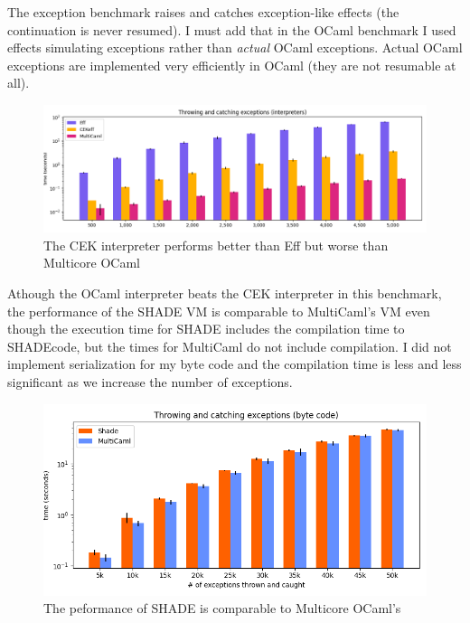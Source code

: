 \documentclass[class=article, crop=false]{standalone}
\begin{document}
The exception benchmark raises and catches exception-like effects (the
continuation is never resumed). I must add that in the OCaml benchmark I used
effects simulating exceptions rather than \emph{actual} OCaml exceptions. Actual
OCaml exceptions are implemented very efficiently in OCaml (they are not
resumable at all).

\begin{figure}
    \centering
    \includegraphics[width=40em]{eval_plots/interp_exception.png}
    \caption{The CEK interpreter performs better than Eff but worse than
    Multicore OCaml}
    \label{fig:exception-interpreters}
\end{figure}

Athough the OCaml interpreter beats the CEK interpreter in this benchmark, the
performance of the SHADE VM is comparable to MultiCaml's VM even though the
execution time for SHADE includes the compilation time to SHADEcode,
but the times for MultiCaml do not include compilation. I did not implement
serialization for my byte code and the compilation time is less and less
significant as we increase the number of exceptions.

\begin{figure}
    \centering
    \includegraphics[width=35em]{eval_plots/comp_exception.png}
    \caption{The peformance of SHADE is comparable to Multicore OCaml's}
    \label{fig:exception-bytecode}
\end{figure}
\end{document}
